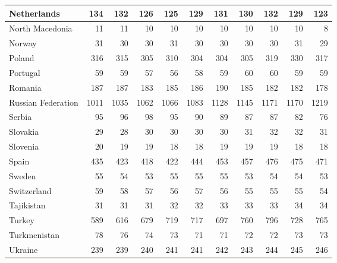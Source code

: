 \begin{table}
\begin{tabular}{|l|r|r|r|r|r|r|r|r|r|r|}
                   Netherlands&    134&    132&    126&    125&    129&    131&    130&    132&    129&    123\\\hline
               North Macedonia&     11&     11&     10&     10&     10&     10&     10&     10&     10&      8\\\hline
                        Norway&     31&     30&     30&     31&     30&     30&     30&     30&     31&     29\\\hline
                        Poland&    316&    315&    305&    310&    304&    304&    305&    319&    330&    317\\\hline
                      Portugal&     59&     59&     57&     56&     58&     59&     60&     60&     59&     59\\\hline
                       Romania&    187&    187&    183&    185&    186&    190&    185&    182&    182&    178\\\hline
            Russian Federation&   1011&   1035&   1062&   1066&   1083&   1128&   1145&   1171&   1170&   1219\\\hline
                        Serbia&     95&     96&     98&     95&     90&     89&     87&     87&     82&     76\\\hline
                      Slovakia&     29&     28&     30&     30&     30&     30&     31&     32&     32&     31\\\hline
                      Slovenia&     20&     19&     19&     18&     18&     19&     19&     19&     18&     18\\\hline
                         Spain&    435&    423&    418&    422&    444&    453&    457&    476&    475&    471\\\hline
                        Sweden&     55&     54&     53&     55&     55&     55&     53&     54&     54&     53\\\hline
                   Switzerland&     59&     58&     57&     56&     57&     56&     55&     55&     55&     54\\\hline
                    Tajikistan&     31&     31&     31&     32&     32&     33&     33&     33&     34&     34\\\hline
                        Turkey&    589&    616&    679&    719&    717&    697&    760&    796&    728&    765\\\hline
                  Turkmenistan&     78&     76&     74&     73&     71&     71&     72&     72&     73&     73\\\hline
                       Ukraine&    239&    239&    240&    241&    241&    242&    243&    244&    245&    246\\\hline

\end{tabular}
\end{table}

